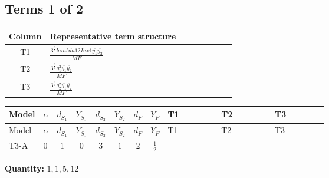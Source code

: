 \documentclass[8pt]{article}
\begin{document}
\begin{landscape}
\subsection*{Terms 1 of 2}
\begin{center}
\begin{tabular}{@{}c >{\raggedright\arraybackslash}p{0.82\linewidth}@{}}
\toprule
Column & Representative term structure \\
\midrule
T1 & \(\displaystyle \frac{3^{\frac{3}{4}} lambda12Inv1 \overline{y_{1}} \overline{y_{2}}}{MF}\) \\
\midrule
T2 & \(\displaystyle \frac{3^{\frac{3}{4}} g_{1}^{2} \overline{y_{1}} \overline{y_{2}}}{MF}\) \\
\midrule
T3 & \(\displaystyle \frac{3^{\frac{3}{4}} g_{2}^{2} \overline{y_{1}} \overline{y_{2}}}{MF}\) \\
\midrule
\bottomrule
\end{tabular}
\end{center}
\smallskip
\tiny
\begin{longtable}{@{}llcccccc >{\raggedright\arraybackslash}p{0.21\linewidth} >{\raggedright\arraybackslash}p{0.21\linewidth} >{\raggedright\arraybackslash}p{0.21\linewidth}@{}}
\toprule
Model & $\alpha$ & $d_{S_1}$ & $Y_{S_1}$ & $d_{S_2}$ & $Y_{S_2}$ & $d_F$ & $Y_F$ & T1 & T2 & T3 \\
\midrule
\endfirsthead
\toprule
Model & $\alpha$ & $d_{S_1}$ & $Y_{S_1}$ & $d_{S_2}$ & $Y_{S_2}$ & $d_F$ & $Y_F$ & T1 & T2 & T3 \\
\midrule
\endhead
T3-A & $0$ & $1$ & $0$ & $3$ & $1$ & $2$ & $\frac{1}{2}$ & \scriptsize\adjustbox{max width=\linewidth}{$\begin{gathered} \frac{3^{\frac{3}{4}} lambda12Inv1 \overline{y_{1}} \overline{y_{2}}}{6 MF}\end{gathered}$} & \scriptsize\adjustbox{max width=\linewidth}{$\begin{gathered} \frac{3^{\frac{3}{4}} g_{1}^{2} \overline{y_{1}} \overline{y_{2}}}{8 MF}\end{gathered}$} & \scriptsize\adjustbox{max width=\linewidth}{$\begin{gathered} \frac{17 \cdot 3^{\frac{3}{4}} g_{2}^{2} \overline{y_{1}} \overline{y_{2}}}{24 MF}\end{gathered}$} \\
\midrule
\bottomrule
\end{longtable}
\clearpage
\noindent\textbf{Quantity: }$\mathrm{1,1,5,12}$\par\smallskip

\end{landscape}
\end{document}
